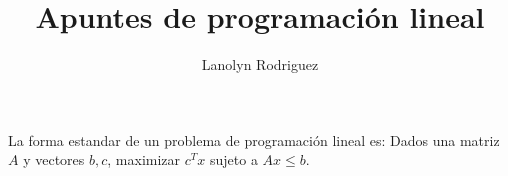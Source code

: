 \documentclass{article}
\title{Apuntes de programación lineal}
\author{Lanolyn Rodriguez}
\begin{document}
\maketitle

La forma estandar de un problema de programación lineal es: Dados una
matriz $A$ y vectores $b,c$, maximizar $c^Tx$ sujeto a $Ax\leq b$.
\end{document}
